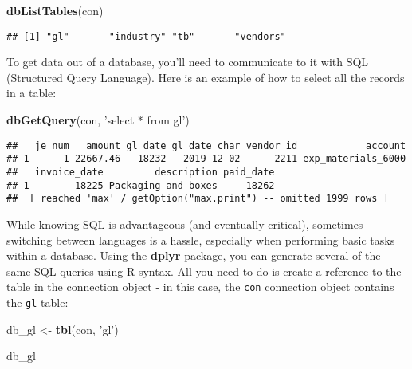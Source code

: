 \documentclass[
]{book}
\newenvironment{Shaded}{\begin{snugshade}}{\end{snugshade}}
\newcommand{\KeywordTok}[1]{\textcolor[rgb]{0.13,0.29,0.53}{\textbf{#1}}}
\newcommand{\NormalTok}[1]{#1}
\newcommand{\StringTok}[1]{\textcolor[rgb]{0.31,0.60,0.02}{#1}}
\begin{document}
\begin{Shaded}
\begin{Highlighting}[]
\KeywordTok{dbListTables}\NormalTok{(con)}
\end{Highlighting}
\end{Shaded}

\begin{verbatim}
## [1] "gl"       "industry" "tb"       "vendors"
\end{verbatim}

To get data out of a database, you'll need to communicate to it with SQL (Structured Query Language). Here is an example of how to select all the records in a table:

\begin{Shaded}
\begin{Highlighting}[]
\KeywordTok{dbGetQuery}\NormalTok{(con, }\StringTok{'select * from gl'}\NormalTok{)}
\end{Highlighting}
\end{Shaded}

\begin{verbatim}
##   je_num   amount gl_date gl_date_char vendor_id            account
## 1      1 22667.46   18232   2019-12-02      2211 exp_materials_6000
##   invoice_date         description paid_date
## 1        18225 Packaging and boxes     18262
##  [ reached 'max' / getOption("max.print") -- omitted 1999 rows ]
\end{verbatim}

While knowing SQL is advantageous (and eventually critical), sometimes switching between languages is a hassle, especially when performing basic tasks within a database. Using the \textbf{dplyr} package, you can generate several of the same SQL queries using R syntax. All you need to do is create a reference to the table in the connection object - in this case, the \texttt{con} connection object contains the \texttt{gl} table:

\begin{Shaded}
\begin{Highlighting}[]
\NormalTok{db_gl <-}\StringTok{ }\KeywordTok{tbl}\NormalTok{(con, }\StringTok{'gl'}\NormalTok{)}

\NormalTok{db_gl}
\end{Highlighting}
\end{Shaded}
\end{document}
